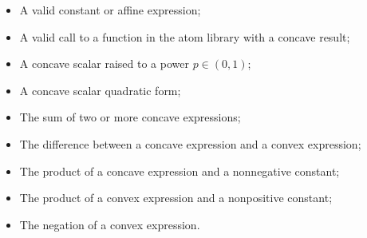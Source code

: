 \documentclass{article}
\begin{document}
\begin{itemize}
\begin{itemize}
        \item A valid constant or affine expression;
        \item A valid call to a function in the atom library with a concave result;
        \item A concave scalar raised to a power \(p\in(0,1)\);
        \item A concave scalar quadratic form;
        \item The sum of two or more concave expressions;
        \item The difference between a concave expression and a convex expression;
        \item The product of a concave expression and a nonnegative constant;
        \item The product of a convex expression and a nonpositive constant;
        \item The negation of a convex expression.
    \end{itemize}
\end{itemize}
\end{document}

